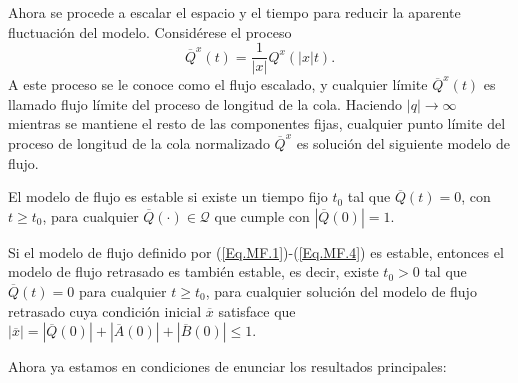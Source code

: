 Ahora se procede a escalar el espacio y el tiempo para reducir la
aparente fluctuaci\'on del modelo. Consid\'erese el proceso
\begin{equation}\label{Eq.3.7}
\overline{Q}^{x}\left(t\right)=\frac{1}{|x|}Q^{x}\left(|x|t\right).
\end{equation}
A este proceso se le conoce como el flujo escalado, y cualquier
l\'imite $\overline{Q}^{x}\left(t\right)$ es llamado flujo
l\'imite del proceso de longitud de la cola. Haciendo
$|q|\rightarrow\infty$ mientras se mantiene el resto de las
componentes fijas, cualquier punto l\'imite del proceso de
longitud de la cola normalizado $\overline{Q}^{x}$ es soluci\'on
del siguiente modelo de flujo.


\begin{Def}
El modelo de flujo es estable si existe un tiempo fijo $t_{0}$ tal
que $\overline{Q}\left(t\right)=0$, con $t\geq t_{0}$, para
cualquier $\overline{Q}\left(\cdot\right)\in\mathcal{Q}$ que
cumple con $|\overline{Q}\left(0\right)|=1$.
\end{Def}

\begin{Lemma}
Si el modelo de flujo definido por (\ref{Eq.MF.1})-(\ref{Eq.MF.4})
es estable, entonces el modelo de flujo retrasado es tambi\'en
estable, es decir, existe $t_{0}>0$ tal que
$\overline{Q}\left(t\right)=0$ para cualquier $t\geq t_{0}$, para
cualquier soluci\'on del modelo de flujo retrasado cuya
condici\'on inicial $\overline{x}$ satisface que
$|\overline{x}|=|\overline{Q}\left(0\right)|+|\overline{A}\left(0\right)|+|\overline{B}\left(0\right)|\leq1$.
\end{Lemma}


Ahora ya estamos en condiciones de enunciar los resultados principales:


